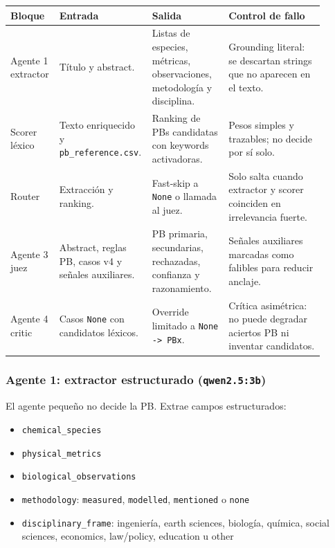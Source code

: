 \begin{center}
\scriptsize
\setlength{\tabcolsep}{4pt}
\renewcommand{\arraystretch}{1.18}
\begin{tabular}{p{0.14\linewidth}p{0.22\linewidth}p{0.24\linewidth}p{0.30\linewidth}}
\toprule
Bloque & Entrada & Salida & Control de fallo \\
\midrule
Agente 1 extractor & Título y abstract. & Listas de especies, métricas, observaciones, metodología y disciplina. & Grounding literal: se descartan strings que no aparecen en el texto. \\
Scorer léxico & Texto enriquecido y \texttt{pb\_reference.csv}. & Ranking de PBs candidatas con keywords activadoras. & Pesos simples y trazables; no decide por sí solo. \\
Router & Extracción y ranking. & Fast-skip a \texttt{None} o llamada al juez. & Solo salta cuando extractor y scorer coinciden en irrelevancia fuerte. \\
Agente 3 juez & Abstract, reglas PB, casos v4 y señales auxiliares. & PB primaria, secundarias, rechazadas, confianza y razonamiento. & Señales auxiliares marcadas como falibles para reducir anclaje. \\
Agente 4 critic & Casos \texttt{None} con candidatos léxicos. & Override limitado a \texttt{None -> PBx}. & Crítica asimétrica: no puede degradar aciertos PB ni inventar candidatos. \\
\bottomrule
\end{tabular}
\end{center}

\subsubsection{Agente 1: extractor estructurado (\texttt{qwen2.5:3b})}

El agente pequeño no decide la PB. Extrae campos estructurados:

\begin{itemize}
\item \texttt{chemical\_species}
\item \texttt{physical\_metrics}
\item \texttt{biological\_observations}
\item \texttt{methodology}: \texttt{measured}, \texttt{modelled}, \texttt{mentioned} o \texttt{none}
\item \texttt{disciplinary\_frame}: ingeniería, earth sciences, biología, química, social sciences, economics, law/policy, education u other
\end{itemize}

